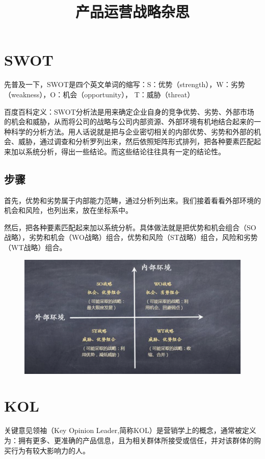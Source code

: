 \documentclass[12pt]{article}
\title{产品运营战略杂思}
\begin{document}
\maketitle
\tableofcontents

\section{SWOT}
先普及一下，SWOT是四个英文单词的缩写：S：优势（strength），W：劣势 （weakness），O：机会（opportunity）， T：威胁（threat）

百度百科定义：SWOT分析法是用来确定企业自身的竞争优势、劣势、外部市场的机会和威胁，从而将公司的战略与公司内部资源、外部环境有机地结合起来的一种科学的分析方法。用人话说就是把与企业密切相关的内部优势、劣势和外部的机会、威胁，通过调查和分析罗列出来，然后依照矩阵形式排列，把各种要素匹配起来加以系统分析，得出一些结论。而这些结论往往具有一定的结论性。

\subsection{步骤}
首先，优势和劣势属于内部能力范畴，通过分析列出来。我们接着看看外部环境的机会和风险，也列出来，放在坐标系中。

然后，把各种要素匹配起来加以系统分析。具体做法就是把优势和机会组合（SO战略），劣势和机会（WO战略）组合，优势和风险（ST战略）组合，风险和劣势（WT战略）组合。

\begin{figure}[H]
    \centering
    \includegraphics[width=1\textwidth]{fig/SWOT.png}
\end{figure}

\section{KOL}
关键意见领袖（Key Opinion Leader,简称KOL）是营销学上的概念，通常被定义为：拥有更多、更准确的产品信息，且为相关群体所接受或信任，并对该群体的购买行为有较大影响力的人。
\end{document}
